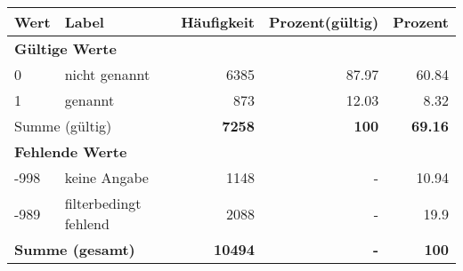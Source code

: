      \begin{longtable}{lXrrr}
     \toprule
     \textbf{Wert} & \textbf{Label} & \textbf{Häufigkeit} & \textbf{Prozent(gültig)} & \textbf{Prozent} \\
     \endhead
     \midrule
     \multicolumn{5}{l}{\textbf{Gültige Werte}}\\

     0 &
     \multicolumn{1}{X}{ nicht genannt   } &


       \num{6385} &
       \num[round-mode=places,round-precision=2]{87,97} &
         \num[round-mode=places,round-precision=2]{60,84} \\

     1 &
     \multicolumn{1}{X}{ genannt   } &


       \num{873} &
       \num[round-mode=places,round-precision=2]{12,03} &
         \num[round-mode=places,round-precision=2]{8,32} \\
     \midrule
     \multicolumn{2}{l}{Summe (gültig)} &
       \textbf{\num{7258}} &
     \textbf{100} &
       \textbf{\num[round-mode=places,round-precision=2]{69,16}} \\
     \multicolumn{5}{l}{\textbf{Fehlende Werte}}\\
       -998 &
       keine Angabe &
         \num{1148} &
        - &
         \num[round-mode=places,round-precision=2]{10,94} \\
       -989 &
       filterbedingt fehlend &
         \num{2088} &
        - &
         \num[round-mode=places,round-precision=2]{19,9} \\
     \midrule
     \multicolumn{2}{l}{\textbf{Summe (gesamt)}} &
          \textbf{\num{10494}} &
        \textbf{-} &
        \textbf{100} \\
     \bottomrule
     \end{longtable}
     
